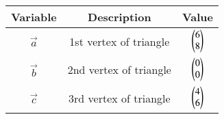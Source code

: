 \begin{center}
    \begin{tabular}{|c|c|c|} 
        \hline
            \textbf{Variable} & \textbf{Description} & \textbf{Value} \\ 
        \hline
            $\vec{a}$    & 1st vertex of triangle & $\begin{pmatrix}6\\8\end{pmatrix}$ \\ 
        \hline
            $\vec{b}$    & 2nd vertex of triangle & $\begin{pmatrix}0\\0\end{pmatrix}$\\ 
        \hline
            $\vec{c}$    & 3rd vertex of triangle & $\begin{pmatrix}4\\6\end{pmatrix}$\\
        \hline
    \end{tabular}
\end{center}